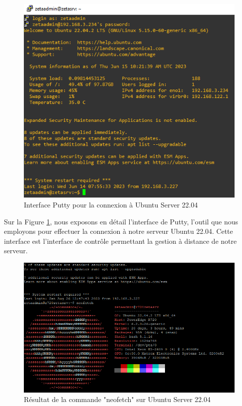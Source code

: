 \begin{figure}[H]
  \centering
  \includegraphics[width=15cm]{Images/zetaserver.png}
  \caption{Interface Putty pour la connexion à Ubuntu Server 22.04}
  \label{fig:putty-interface}
\end{figure}

Sur la Figure \ref{fig:putty-interface}, nous exposons en détail l'interface de Putty, l'outil que nous employons pour effectuer la connexion à notre serveur Ubuntu 22.04. Cette interface est l'interface de contrôle permettant la gestion à distance de notre serveur.

\begin{figure}[H]
  \centering
  \includegraphics[width=15cm]{Images/neofetchzetasrv1.png}
  \caption{Résultat de la commande "neofetch" sur Ubuntu Server 22.04}
  \label{fig:neofetch-result}
\end{figure}

